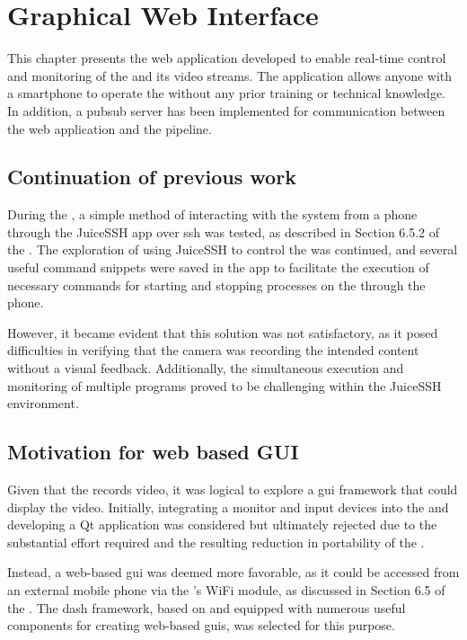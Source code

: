 \chapter{Graphical Web Interface}
\label{chap:gui}
This chapter presents the web application developed to enable real-time control and monitoring of the \sr and its video streams.
The application allows anyone with a smartphone to operate the \sr without any prior training or technical knowledge.
In addition, a \gls{pubsub} server has been implemented for communication between the web application and the pipeline.


\section{Continuation of previous work}
During the \preproject, a simple method of interacting with the system from a phone through the JuiceSSH app over \gls{ssh} was tested, as described in Section 6.5.2 of the \preproject.
The exploration of using JuiceSSH to control the \sr was continued, and several useful command snippets were saved in the app to facilitate the execution of necessary commands for starting and stopping processes on the \jx through the phone.

However, it became evident that this solution was not satisfactory, as it posed difficulties in verifying that the camera was recording the intended content without a visual feedback.
Additionally, the simultaneous execution and monitoring of multiple programs proved to be challenging within the JuiceSSH environment.


\section{Motivation for web based GUI}
Given that the \sr records video, it was logical to explore a \gls{gui} framework that could display the video.
Initially, integrating a monitor and input devices into the \sr and developing a Qt application was considered but ultimately rejected due to the substantial effort required and the resulting reduction in portability of the \sr.

Instead, a web-based \gls{gui} was deemed more favorable, as it could be accessed from an external mobile phone via the \sr's WiFi module, as discussed in Section 6.5 of the \preproject.
The \gls{dash} framework, based on \py and equipped with numerous useful components for creating web-based \glspl{gui}, was selected for this purpose.

